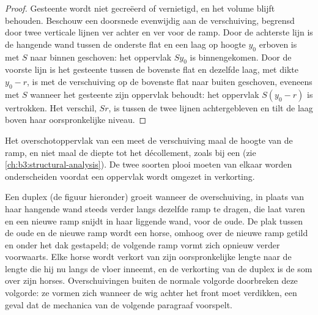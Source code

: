 \begin{proof}
Gesteente wordt niet gecreëerd of vernietigd, en het volume blijft behouden. Beschouw een doorsnede
evenwijdig aan de verschuiving, begrensd door twee verticale lijnen ver achter en ver voor
de ramp. Door de achterste lijn is de hangende wand tussen de onderste
flat en een laag op hoogte $y_0$ erboven is met $S$ naar binnen geschoven: het oppervlak
$Sy_0$ is binnengekomen. Door de voorste lijn is het gesteente tussen de bovenste flat
en dezelfde laag, met dikte $y_0 - r$, is met de verschuiving op de
bovenste flat naar buiten geschoven, eveneens met $S$ wanneer het gesteente zijn oppervlak behoudt: het oppervlak $S(y_0 - r)$
is vertrokken. Het verschil, $Sr$, is tussen de twee lijnen achtergebleven en tilt
de laag boven haar oorspronkelijke niveau.
\end{proof}

Het overschotoppervlak van een  meet de verschuiving maal de hoogte van
de ramp, en niet maal de diepte tot het décollement, zoals bij een
 (zie \cref{ch:b3:structural-analysis}). De twee soorten plooi
moeten van elkaar worden onderscheiden voordat een oppervlak wordt omgezet in verkorting.


Een duplex (de figuur hieronder) groeit wanneer de overschuiving, in plaats van haar hangende wand
steeds verder langs dezelfde ramp te dragen, die laat varen en een nieuwe ramp snijdt in haar liggende wand,
voor de oude. De plak tussen de oude en de nieuwe ramp wordt een
horse, omhoog over de nieuwe ramp getild en onder het dak gestapeld; de volgende ramp
vormt zich opnieuw verder voorwaarts. Elke horse wordt verkort van zijn oorspronkelijke lengte naar de
lengte die hij nu langs de vloer inneemt, en de verkorting van de duplex is
de som over zijn horses. Overschuivingen buiten de normale volgorde doorbreken deze volgorde: ze vormen zich
wanneer de wig achter het front moet verdikken, een geval dat de mechanica van de
volgende paragraaf voorspelt.

